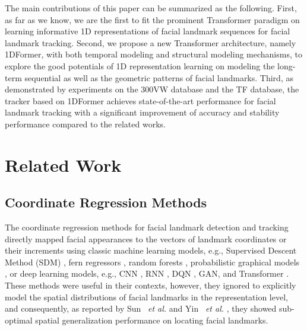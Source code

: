 \documentclass[review]{elsarticle}
\begin{document}
The main contributions of this paper can be summarized as the following. First, as far as we know, we are the first to fit the prominent Transformer paradigm on learning informative 1D representations of facial landmark sequences for facial landmark tracking. Second, we propose a new Transformer architecture, namely 1DFormer, with both temporal modeling and structural modeling mechanisms, to explore the good potentials of 1D representation learning on modeling the long-term sequential as well as the geometric patterns of facial landmarks. Third, as demonstrated by experiments on the 300VW database and the TF database, the tracker based on 1DFormer achieves state-of-the-art performance for facial landmark tracking with a significant improvement of accuracy and stability performance compared to the related works. 



\section{Related Work}
\label{related_work}

\subsection{Coordinate Regression Methods}
The coordinate regression methods for facial landmark detection \cite{ESR,Xavier,Ren,CascadedTransformers, RePFormer} and tracking \cite{SDM,TSTN,TSCN,GAN_Tracking,DBN,RBM,Qtracker}  directly
mapped facial appearances to the vectors of landmark coordinates or their increments using classic machine learning models, e.g., Supervised Descent Method (SDM) \cite{SDM}, fern regressors \cite{ESR,Xavier}, random forests \cite{Ren}, probabilistic graphical models \cite{DBN,RBM}, or deep learning models, e.g., CNN \cite{wing,TSCN,DBLP:journals/access/ColacoH22}, RNN \cite{TSTN}, DQN \cite{Qtracker}, GAN\cite{GAN_Tracking}, and Transformer \cite{CascadedTransformers, RePFormer}. These methods were useful in their contexts, however, they ignored to explicitly model the spatial distributions of facial landmarks in the representation level, and consequently,  as reported by Sun ~\emph{et al.} \cite{better_heatmap1} and Yin ~\emph{et al.} \cite{AOHR}, they showed sub-optimal spatial generalization performance on locating facial landmarks.
\end{document}
